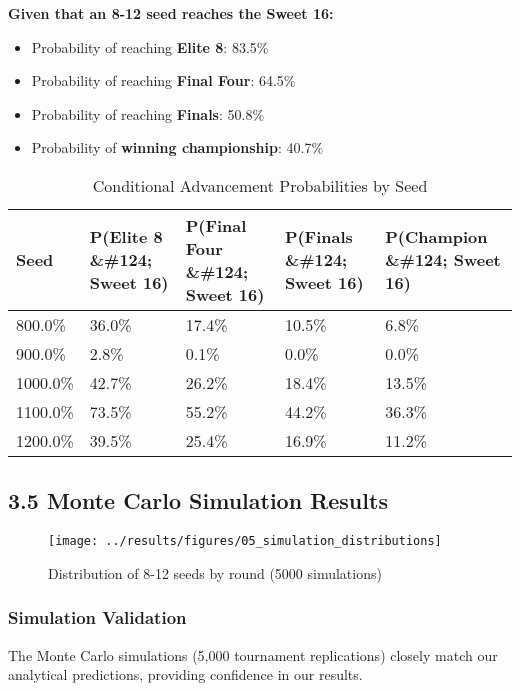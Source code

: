 \documentclass[
]{article}
\providecommand{\tightlist}{%
  \setlength{\itemsep}{0pt}\setlength{\parskip}{0pt}}
\begin{document}
\textbf{Given that an 8-12 seed reaches the Sweet 16:}

\begin{itemize}
\tightlist
\item
  Probability of reaching \textbf{Elite 8}: 83.5\%
\item
  Probability of reaching \textbf{Final Four}: 64.5\%
\item
  Probability of reaching \textbf{Finals}: 50.8\%
\item
  Probability of \textbf{winning championship}: 40.7\%
\end{itemize}

\begin{longtable}[t]{lllll}
\caption{\label{tab:conditional-table}Conditional Advancement Probabilities by Seed}\\
\toprule
Seed & P(Elite 8 \&\#124; Sweet 16) & P(Final Four \&\#124; Sweet 16) & P(Finals \&\#124; Sweet 16) & P(Champion \&\#124; Sweet 16)\\
\midrule
800.0\% & 36.0\% & 17.4\% & 10.5\% & 6.8\%\\
900.0\% & 2.8\% & 0.1\% & 0.0\% & 0.0\%\\
1000.0\% & 42.7\% & 26.2\% & 18.4\% & 13.5\%\\
1100.0\% & 73.5\% & 55.2\% & 44.2\% & 36.3\%\\
1200.0\% & 39.5\% & 25.4\% & 16.9\% & 11.2\%\\
\bottomrule
\end{longtable}

\subsection{3.5 Monte Carlo Simulation
Results}\label{monte-carlo-simulation-results}

\begin{figure}

{\centering \texttt{[image: ../results/figures/05\_simulation\_distributions]} 

}

\caption{Distribution of 8-12 seeds by round (5000 simulations)}\label{fig:simulation-plot}
\end{figure}

\subsubsection{Simulation Validation}\label{simulation-validation}

The Monte Carlo simulations (5,000 tournament replications) closely
match our analytical predictions, providing confidence in our results.
\end{document}

